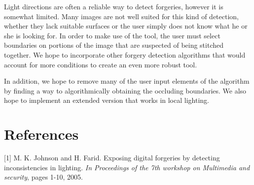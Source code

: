 \documentclass[10pt,twocolumn,letterpaper]{article}
\begin{document}
Light directions are often a reliable way to detect forgeries, however it is somewhat limited. Many images are not well suited for this kind of detection, whether they lack suitable surfaces or the user simply does not know what he or she is looking for. In order to make use of the tool, the user must select boundaries on portions of the image that are suspected of being stitched together. We hope to incorporate other forgery detection algorithms that would account for more conditions to create an even more robust tool.

In addition, we hope to remove many of the user input elements of the algorithm by finding a way to algorithmically obtaining the occluding boundaries. We also hope to implement an extended version that works in local lighting.
\section{References}

[1] M. K. Johnson and H. Farid. Exposing digital forgeries by detecting inconsistencies in lighting. \emph{In Proceedings of the 7th workshop on Multimedia and security}, pages 1-10, 2005.
\end{document}
